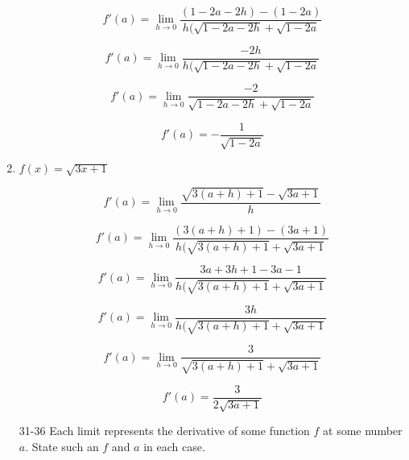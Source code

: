 \documentclass{article}
\begin{document}
\begin{enumerate}
			$$f'(a) = \lim \limits _{h \to 0} \frac{(1-2a-2h) - (1-2a)}{h(\sqrt{1-2a-2h} + \sqrt{1-2a}}$$

			$$f'(a) = \lim \limits _{h \to 0} \frac{-2h}{h(\sqrt{1-2a-2h} + \sqrt{1-2a}}$$

			$$f'(a) = \lim \limits _{h \to 0} \frac{-2}{\sqrt{1-2a-2h} + \sqrt{1-2a}}$$

			$$f'(a) = - \frac{1}{\sqrt{1-2a}}$$

		\item $f(x) = \sqrt{3x+1}$

			$$f'(a) = \lim \limits _{h \to 0} \frac{\sqrt{3(a+h)+1} - \sqrt{3a+1}}{h}$$

			$$f'(a) = \lim \limits _{h \to 0} \frac{(3(a+h)+1) - (3a+1)}{h(\sqrt{3(a+h)+1} + \sqrt{3a+1}}$$

			$$f'(a) = \lim \limits _{h \to 0} \frac{3a + 3h  + 1 - 3a - 1}{h(\sqrt{3(a+h)+1}+\sqrt{3a+1}}$$

			$$f'(a) = \lim \limits _{h \to 0} \frac{3h}{h(\sqrt{3(a+h)+1} + \sqrt{3a+1}}$$

			$$f'(a) = \lim \limits _{h \to 0} \frac{3}{\sqrt{3(a+h)+1} + \sqrt{3a+1}}$$

			$$f'(a) = \frac{3}{2\sqrt{3a+1}}$$

		\item[31-36] Each limit represents the derivative of some function $f$ at some number $a$. State
				such an $f$ and $a$ in each case.
	\end{enumerate}
\end{document}
